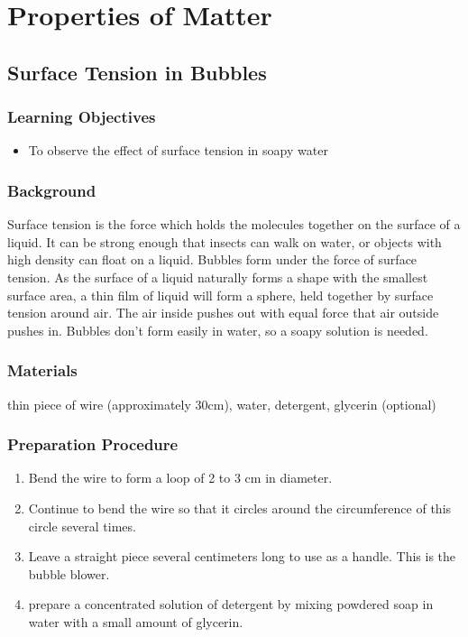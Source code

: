 \section{Properties of Matter}

\subsection{Surface Tension in Bubbles}

\subsubsection*{Learning Objectives}
\begin{itemize}
\item{To observe the effect of surface tension in soapy water}
\end{itemize}

\subsubsection*{Background}
Surface tension is the force which holds the molecules together on the surface of a liquid. It can be strong enough that insects can walk on water, or objects with high density can float on a liquid. Bubbles form under the force of surface tension. As the surface of a liquid naturally forms a shape with the smallest surface area, a thin film of liquid will form a sphere, held together by surface tension around air. The air inside pushes out with equal force that air outside pushes in. Bubbles don't form easily in water, so a soapy solution is needed.

\subsubsection*{Materials}
thin piece of wire (approximately 30cm), water, detergent, glycerin (optional)

\subsubsection*{Preparation Procedure}
\begin{enumerate}
\item{Bend the wire to form a loop of 2 to 3 cm in diameter.}
\item{Continue to bend the wire so that it circles around the circumference of this circle several times.}
\item{Leave a straight piece several centimeters long to use as a handle. This is the bubble blower.}
\item{prepare a concentrated solution of detergent by mixing powdered soap in water with a small amount of glycerin.}
\end{enumerate}

